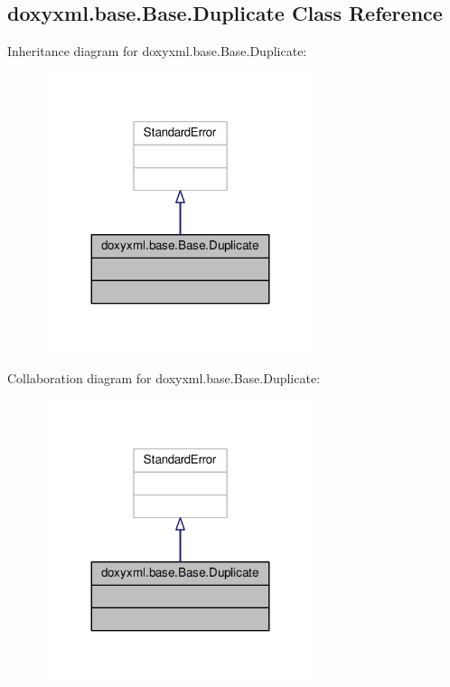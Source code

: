 \subsection{doxyxml.\+base.\+Base.\+Duplicate Class Reference}
\label{classdoxyxml_1_1base_1_1Base_1_1Duplicate}


Inheritance diagram for doxyxml.\+base.\+Base.\+Duplicate\+:
\nopagebreak
\begin{figure}[H]
\begin{center}
\leavevmode
\includegraphics[width=227pt]{dd/d1e/classdoxyxml_1_1base_1_1Base_1_1Duplicate__inherit__graph}
\end{center}
\end{figure}


Collaboration diagram for doxyxml.\+base.\+Base.\+Duplicate\+:
\nopagebreak
\begin{figure}[H]
\begin{center}
\leavevmode
\includegraphics[width=227pt]{d4/d52/classdoxyxml_1_1base_1_1Base_1_1Duplicate__coll__graph}
\end{center}
\end{figure}


